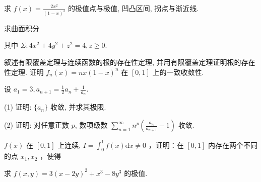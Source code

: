 \par{}
求 $f(x) = \frac{2x^2}{(1 - x)^2}$ 的极值点与极值, 凹凸区间, 拐点与渐近线.\par
\par{}
\par{}
求曲面积分\par
\nopagebreak[4]
其中  $\Sigma: 4x^{2} + 4y^{2} + z^{2} = 4, z \geq 0.$\par
\par{}
叙述有限覆盖定理与连续函数的根的存在性定理, 并用有限覆盖定理证明根的存在性定理.
证明  $f_{n}(x)=nx(1-x)^{n}$  在  $[0,1]$  上的一致收敛性.\par
\par{}
设 $a_1 = 3, a_{n+1} = \frac{1}{2} a_n + \frac{1}{a_n}$.\par
(1) 证明: $\{a_{n}\}$ 收敛, 并求其极限.\par
(2) 证明: 对任意正数 $p$, 数项级数 $\sum_{n=1}^{\infty} n^{p} \left( \frac{a_{n}}{a_{n+1}} - 1 \right)$ 收敛.\par
\par{}
\par{}
$f(x)$ 在 $[0,1]$ 上连续, $I = \int_0^1 f(x)\mathrm{d}x\neq 0$ ，证明：在 $[0,1]$ 内存在两个不同的点 $x_{1},x_{2}$ ，使得\par
\nopagebreak[4]
\par{}
求 $f(x, y) = 3(x - 2y)^2 + x^3 - 8y^3$ 的极值.\par
